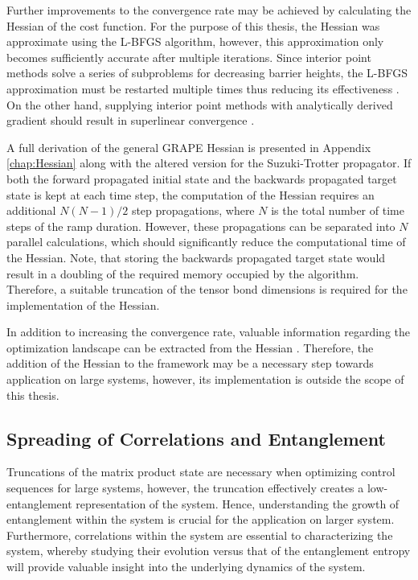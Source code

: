 Further improvements to the convergence rate may be achieved by calculating the Hessian of the cost function. For the purpose of this thesis, the Hessian was approximate using the L-BFGS algorithm, however, this approximation only becomes sufficiently accurate after multiple iterations. Since interior point methods solve a series of subproblems for decreasing barrier heights, the L-BFGS approximation must be restarted multiple times thus reducing its effectiveness \cite{Wachter2006}. On the other hand, supplying interior point methods with analytically derived gradient should result in superlinear convergence \cite{wright}.

A full derivation of the general GRAPE Hessian is presented in Appendix \ref{chap:Hessian} along with the altered version for the Suzuki-Trotter propagator. If both the forward propagated initial state and the backwards propagated target state is kept at each time step, the computation of the Hessian requires an additional $N(N - 1)/2$ step propagations, where $N$ is the total number of time steps of the ramp duration. However, these propagations can be separated into $N$ parallel calculations, which should significantly reduce the computational time of the Hessian. Note, that storing the backwards propagated target state would result in a doubling of the required memory occupied by the algorithm. Therefore, a suitable truncation of the tensor bond dimensions is required for the implementation of the Hessian.

In addition to increasing the convergence rate, valuable information regarding the optimization landscape can be extracted from the Hessian \cite{Shen2006}. Therefore, the addition of the Hessian to the framework may be a necessary step towards application on large systems, however, its implementation is outside the scope of this thesis.


\subsection{Spreading of Correlations and Entanglement}
Truncations of the matrix product state are necessary when optimizing control sequences for large systems, however, the truncation effectively creates a low-entanglement representation of the system. Hence, understanding the growth of entanglement within the system is crucial for the application on larger system. Furthermore, correlations within the system are essential to characterizing the system, whereby studying their evolution versus that of the entanglement entropy will provide valuable insight into the underlying dynamics of the system.

